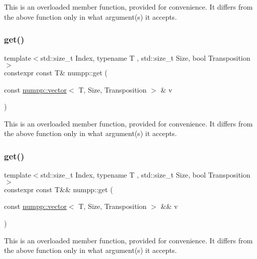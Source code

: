 This is an overloaded member function, provided for convenience. It differs from the above function only in what argument(s) it accepts.\mbox{\label{group__numpp__structures__vector_ga1a445b047ad3c94be0a15bf228bb5b5d}} 
\subsubsection{\texorpdfstring{get()}{get()}\hspace{0.1cm}{\footnotesize\ttfamily [3/4]}}
{\footnotesize\ttfamily template$<$std\+::size\+\_\+t Index, typename T , std\+::size\+\_\+t Size, bool Transposition$>$ \\
constexpr const T\& numpp\+::get (\begin{DoxyParamCaption}\item[{const \hyperlink{classnumpp_1_1vector}{numpp\+::vector}$<$ T, Size, Transposition $>$ \&}]{v }\end{DoxyParamCaption})}

This is an overloaded member function, provided for convenience. It differs from the above function only in what argument(s) it accepts.\mbox{\label{group__numpp__structures__vector_ga492c948b84cb987e083a913814549e8a}} 
\subsubsection{\texorpdfstring{get()}{get()}\hspace{0.1cm}{\footnotesize\ttfamily [4/4]}}
{\footnotesize\ttfamily template$<$std\+::size\+\_\+t Index, typename T , std\+::size\+\_\+t Size, bool Transposition$>$ \\
constexpr const T\&\& numpp\+::get (\begin{DoxyParamCaption}\item[{const \hyperlink{classnumpp_1_1vector}{numpp\+::vector}$<$ T, Size, Transposition $>$ \&\&}]{v }\end{DoxyParamCaption})}

This is an overloaded member function, provided for convenience. It differs from the above function only in what argument(s) it accepts.\mbox{\label{group__numpp__structures__vector_ga4847adde1fdd241339308615285974ad}} 

